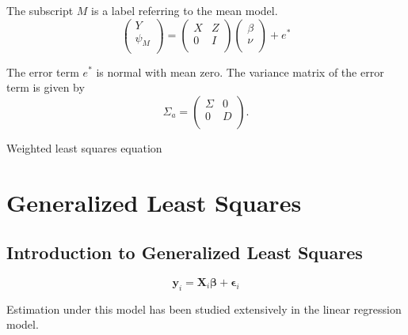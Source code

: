 \documentclass[Main.tex]{subfiles}
\begin{document}
The subscript $M$ is a label referring to the mean model.
\begin{equation}
\left(%
\begin{array}{c}
Y \\
\psi_{M} \\
\end{array}%
\right) = \left(
\begin{array}{cc}
X & Z \\
0 & I \\
\end{array}\right) \left(%
\begin{array}{c}
\beta \\
\nu \\
\end{array}%
\right)+ e^{*}
\end{equation}




The error term $e^{*}$ is normal with mean zero. The variance matrix of the error term is given by
\begin{equation}
\Sigma_{a} = \left(%
\begin{array}{cc}
\Sigma & 0 \\
0 & D \\
\end{array}%
\right).
\end{equation}



Weighted least squares equation







\section{Generalized Least Squares}

\subsection{Introduction to Generalized Least Squares}
\begin{equation}
\boldsymbol{y}_i = \boldsymbol{X}_i\boldsymbol{\beta} + \boldsymbol{\epsilon}_i
\end{equation}

Estimation under this model has been studied extensively in the linear regression model.
\end{document}

